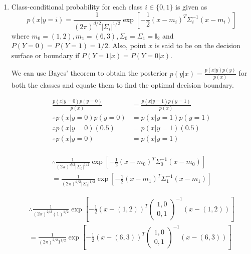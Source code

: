 \begin{enumerate}

	\item 
		Class-conditional probability for each class $i \in \{0, 1\}$ is given as 
		$$p(x | y = i) = \frac{1}{(2\pi)^{d / 2} |\Sigma_{i}|^{1 / 2} } \exp{\left[ -\frac{1}{2}(x - m_{i})^{T} \Sigma_{i}^{-1} (x - m_{i}) \right]}$$
		where $m_{0} = (1, 2), m_{1} = (6, 3), \Sigma_{0} = \Sigma_{1} = \mathbb{I}_{2}$ and $P(Y= 0) = P(Y = 1) = 1 / 2$. Also, point $x$ is said to be on the decision surface or boundary if $P(Y = 1 | x) = P(Y = 0 | x)$. 
		
		We can use Bayes' theorem to obtain the posterior $p(y | x) = \frac{p(x | y)p(y)}{p(x)}$ for both the classes and equate them to find the optimal decision boundary.

        \begin{align*}
            \frac{p(x | y = 0)p(y = 0)}{p(x)} & = \frac{p(x | y = 1)p(y = 1)}{p(x)} \\			
			\therefore p(x | y = 0)p(y = 0) & = p(x | y = 1)p(y = 1) \\
			\therefore p(x | y = 0)(0.5) & = p(x | y = 1)(0.5) \\
			\therefore p(x | y = 0) & = p(x | y = 1) \\					
        \end{align*}

        \begin{multline*}
            \therefore \frac{1}{(2\pi)^{d / 2} |\Sigma_{0}|^{1 / 2} } \exp{\left[ -\frac{1}{2}(x - m_{0})^{T} \Sigma_{0}^{-1} (x - m_{0}) \right]} \\ = \frac{1}{(2\pi)^{d / 2} |\Sigma_{1}|^{1 / 2} } \exp{\left[ -\frac{1}{2}(x - m_{1})^{T} \Sigma_{1}^{-1} (x - m_{1}) \right]}
        \end{multline*}
        
		\begin{multline*}
		    \therefore \frac{1}{(2\pi)^{2 / 2} (1)^{1 / 2} } \exp{\left[ -\frac{1}{2}(x - (1, 2))^{T} \begin{pmatrix} 1, 0 \\ 0, 1 \end{pmatrix}^{-1} (x - (1, 2)) \right]} \\ = \frac{1}{(2\pi)^{2 / 2} 1^{1 / 2} } \exp{\left[ -\frac{1}{2}(x - (6, 3))^{T} \begin{pmatrix} 1, 0 \\ 0, 1 \end{pmatrix}^{-1} (x - (6, 3)) \right]} \\
		\end{multline*}
    		

\end{enumerate}
